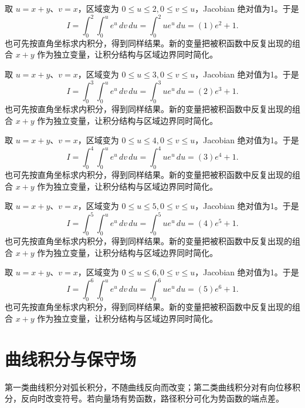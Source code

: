 \documentclass[UTF8,12pt,a4paper,fontset=fandol]{ctexart}
\begin{document}
\begin{solve}\label{ans:c40q20}
取 $u=x+y$、$v=x$，区域变为 $0\le u\le 2,0\le v\le u$，Jacobian 绝对值为1。于是
\[
I=\int_0^{2}\int_0^ue^u\,dv\,du=\int_0^{2}ue^u\,du=(1)e^{2}+1.
\]
也可先按直角坐标求内积分，得到同样结果。新的变量把被积函数中反复出现的组合 $x+y$ 作为独立变量，让积分结构与区域边界同时简化。
\end{solve}

\begin{solve}\label{ans:c40q21}
取 $u=x+y$、$v=x$，区域变为 $0\le u\le 3,0\le v\le u$，Jacobian 绝对值为1。于是
\[
I=\int_0^{3}\int_0^ue^u\,dv\,du=\int_0^{3}ue^u\,du=(2)e^{3}+1.
\]
也可先按直角坐标求内积分，得到同样结果。新的变量把被积函数中反复出现的组合 $x+y$ 作为独立变量，让积分结构与区域边界同时简化。
\end{solve}

\begin{solve}\label{ans:c40q22}
取 $u=x+y$、$v=x$，区域变为 $0\le u\le 4,0\le v\le u$，Jacobian 绝对值为1。于是
\[
I=\int_0^{4}\int_0^ue^u\,dv\,du=\int_0^{4}ue^u\,du=(3)e^{4}+1.
\]
也可先按直角坐标求内积分，得到同样结果。新的变量把被积函数中反复出现的组合 $x+y$ 作为独立变量，让积分结构与区域边界同时简化。
\end{solve}

\begin{solve}\label{ans:c40q23}
取 $u=x+y$、$v=x$，区域变为 $0\le u\le 5,0\le v\le u$，Jacobian 绝对值为1。于是
\[
I=\int_0^{5}\int_0^ue^u\,dv\,du=\int_0^{5}ue^u\,du=(4)e^{5}+1.
\]
也可先按直角坐标求内积分，得到同样结果。新的变量把被积函数中反复出现的组合 $x+y$ 作为独立变量，让积分结构与区域边界同时简化。
\end{solve}

\begin{solve}\label{ans:c40q24}
取 $u=x+y$、$v=x$，区域变为 $0\le u\le 6,0\le v\le u$，Jacobian 绝对值为1。于是
\[
I=\int_0^{6}\int_0^ue^u\,dv\,du=\int_0^{6}ue^u\,du=(5)e^{6}+1.
\]
也可先按直角坐标求内积分，得到同样结果。新的变量把被积函数中反复出现的组合 $x+y$ 作为独立变量，让积分结构与区域边界同时简化。
\end{solve}

\clearpage
\section{曲线积分与保守场}\label{sec:ch41}
第一类曲线积分对弧长积分，不随曲线反向而改变；第二类曲线积分对有向位移积分，反向时改变符号。若向量场有势函数，路径积分可化为势函数的端点差。
\end{document}
